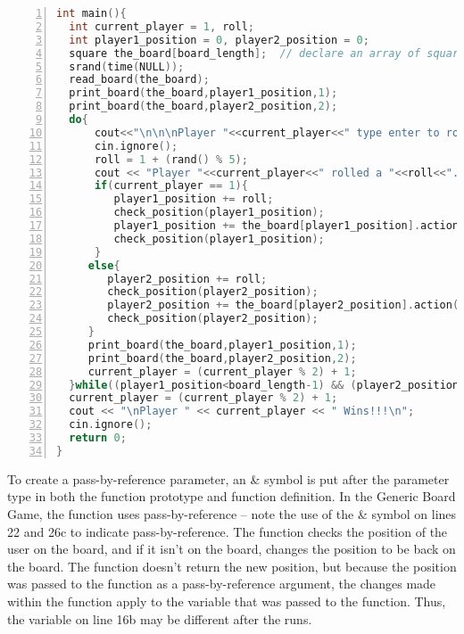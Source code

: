 \begin{minipage}{\textwidth}
\renewcommand*\thelstnumber{\the\value{lstnumber}b}
\begin{lstlisting}[language=C++,numbers = left,xleftmargin=4.0ex, basicstyle=\small, emph={current_player,player1_position,player2_position,the_board},emphstyle = \color{\mycolor},
showstringspaces=false,breaklines=true,
  breakatwhitespace=true,
caption = {The \codefont{main()} function for the Generic Board Game.},
label={listing:GenericGameB}]
int main(){
  int current_player = 1, roll;
  int player1_position = 0, player2_position = 0;
  square the_board[board_length];  // declare an array of squares
  srand(time(NULL));
  read_board(the_board);
  print_board(the_board,player1_position,1);
  print_board(the_board,player2_position,2);
  do{
      cout<<"\n\n\nPlayer "<<current_player<<" type enter to roll.\n";
      cin.ignore();
      roll = 1 + (rand() % 5);
      cout << "Player "<<current_player<<" rolled a "<<roll<<".\n";
      if(current_player == 1){
         player1_position += roll;
         check_position(player1_position);
         player1_position += the_board[player1_position].action();
         check_position(player1_position);
      }
     else{
        player2_position += roll;
        check_position(player2_position);
        player2_position += the_board[player2_position].action();
        check_position(player2_position);
     }
     print_board(the_board,player1_position,1);
     print_board(the_board,player2_position,2);
     current_player = (current_player % 2) + 1;
  }while((player1_position<board_length-1) && (player2_position<board_length-1));
  current_player = (current_player % 2) + 1;
  cout << "\nPlayer " << current_player << " Wins!!!\n";
  cin.ignore();
  return 0;
}
\end{lstlisting}
\end{minipage}

To create a pass-by-reference parameter, an \& symbol is put after the parameter type in both the function prototype and function definition.  In the Generic Board Game, the  function uses pass-by-reference -- note the use of the \& symbol on lines 22 and 26c to indicate pass-by-reference.  The  function checks the position of the user on the board, and if it isn't on the board, changes the position to be back on the board.  The function doesn't return the new position, but because the position was passed to the function as a pass-by-reference argument, the changes made within the function apply to the variable that was passed to the function.  Thus, the variable  on line 16b may be different after the  runs.

